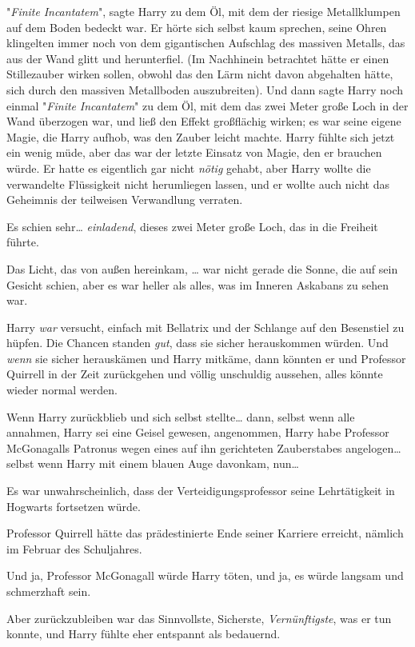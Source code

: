 {"\emph{Finite} \emph{Incantatem}", sagte Harry zu dem Öl, mit dem der riesige Metallklumpen auf dem Boden bedeckt war. Er hörte sich selbst kaum sprechen, seine Ohren klingelten immer noch von dem gigantischen Aufschlag des massiven Metalls, das aus der Wand glitt und herunterfiel. (Im Nachhinein betrachtet hätte er einen Stillezauber wirken sollen, obwohl das den Lärm nicht davon abgehalten hätte, sich durch den massiven Metallboden auszubreiten). Und dann sagte Harry noch einmal "\emph{Finite} \emph{Incantatem}" zu dem Öl, mit dem das zwei Meter große Loch in der Wand überzogen war, und ließ den Effekt großflächig wirken; es war seine eigene Magie, die Harry aufhob, was den Zauber leicht machte. Harry fühlte sich jetzt ein wenig müde, aber das war der letzte Einsatz von Magie, den er brauchen würde. Er hatte es eigentlich gar nicht \emph{nötig} gehabt, aber Harry wollte die verwandelte Flüssigkeit nicht herumliegen lassen, und er wollte auch nicht das Geheimnis der teilweisen Verwandlung verraten.

Es schien sehr… \emph{einladend}, dieses zwei Meter große Loch, das in die Freiheit führte.

Das Licht, das von außen hereinkam, … war nicht gerade die Sonne, die auf sein Gesicht schien, aber es war heller als alles, was im Inneren Askabans zu sehen war.

Harry \emph{war} versucht, einfach mit Bellatrix und der Schlange auf den Besenstiel zu hüpfen. Die Chancen standen \emph{gut}, dass sie sicher herauskommen würden. Und \emph{wenn} sie sicher herauskämen und Harry mitkäme, dann könnten er und Professor Quirrell in der Zeit zurückgehen und völlig unschuldig aussehen, alles könnte wieder normal werden.

Wenn Harry zurückblieb und sich selbst stellte… dann, selbst wenn alle annahmen, Harry sei eine Geisel gewesen, angenommen, Harry habe Professor McGonagalls Patronus wegen eines auf ihn gerichteten Zauberstabes angelogen… selbst wenn Harry mit einem blauen Auge davonkam, nun…

Es war unwahrscheinlich, dass der Verteidigungsprofessor seine Lehrtätigkeit in Hogwarts fortsetzen würde.

Professor Quirrell hätte das prädestinierte Ende seiner Karriere erreicht, nämlich im Februar des Schuljahres.

Und ja, Professor McGonagall würde Harry töten, und ja, es würde langsam und schmerzhaft sein.

Aber zurückzubleiben war das Sinnvollste, Sicherste, \emph{Vernünftigste}, was er tun konnte, und Harry fühlte eher entspannt als bedauernd.

}
